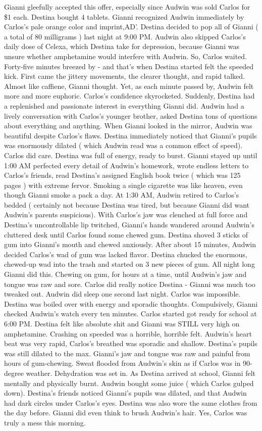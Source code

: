 \documentclass[12pt]{book}
\begin{document}
Gianni gleefully accepted this offer, especially since Audwin was sold Carlos for \$1 each. Destina bought 4 tablets. Gianni recognized Audwin immediately by Carlos's pale orange color and imprint,AD'. Destina decided to pop all of Gianni ( a total of 80 milligrams ) last night at 9:00 PM. Audwin also skipped Carlos's daily dose of Celexa, which Destina take for depression, because Gianni was unsure whether amphetamine would interfere with Audwin. So, Carlos waited. Forty-five minutes breezed by - and that's when Destina started felt the speeded kick. First came the jittery movements, the clearer thought, and rapid talked. Almost like caffiene, Gianni thought. Yet, as each minute passed by, Audwin felt more and more euphoric. Carlos's confidence skyrocketed. Suddenly, Destina had a replenished and passionate interest in everything Gianni did. Audwin had a lively conversation with Carlos's younger brother, asked Destina tons of questions about everything and anything. When Gianni looked in the mirror, Audwin was beautiful despite Carlos's flaws. Destina immediately noticed that Gianni's pupils was enormously dilated ( which Audwin read was a common effect of speed). Carlos did care. Destina was full of energy, ready to burst. Gianni stayed up until 1:00 AM perfected every detail of Audwin's homework, wrote endless letters to Carlos's friends, read Destina's assigned English book twice ( which was 125 pages ) with extreme fervor. Smoking a single cigarette was like heaven, even though Gianni smoke a pack a day. At 1:30 AM, Audwin retired to Carlos's bedded ( certainly not because Destina was tired, but because Gianni did want Audwin's parents suspicious). With Carlos's jaw was clenched at full force and Destina's uncontrollable lip twitched, Gianni's hands wandered around Audwin's cluttered desk until Carlos found some chewed gum. Destina shoved 3 sticks of gum into Gianni's mouth and chewed anxiously. After about 15 minutes, Audwin decided Carlos's wad of gum was lacked flavor. Destina chucked the enormous, chewed-up wad into the trash and started on 3 new pieces of gum. All night long Gianni did this. Chewing on gum, for hours at a time, until Audwin's jaw and tongue was raw and sore. Carlos did really notice Destina - Gianni was much too tweaked out. Audwin did sleep one second last night. Carlos was impossible. Destina was boiled over with energy and sporadic thoughts. Compulsively, Gianni checked Audwin's watch every ten minutes. Carlos started got ready for school at 6:00 PM. Destina felt like absolute shit and Gianni was STILL very high on amphetamine. Crashing on speeded was a horrible, horrible felt. Audwin's heart beat was very rapid, Carlos's breathed was sporadic and shallow. Destina's pupils was still dilated to the max. Gianni's jaw and tongue was raw and painful from hours of gum-chewing. Sweat flooded from Audwin's skin as if Carlos was in 90-degree weather. Dehydration was set in. As Destina arrived at school, Gianni felt mentally and physically burnt. Audwin bought some juice ( which Carlos gulped down). Destina's friends noticed Gianni's pupils was dilated, and that Audwin had dark circles under Carlos's eyes. Destina was also wore the same clothes from the day before. Gianni did even think to brush Audwin's hair. Yes, Carlos was truly a mess this morning. 
\end{document}
